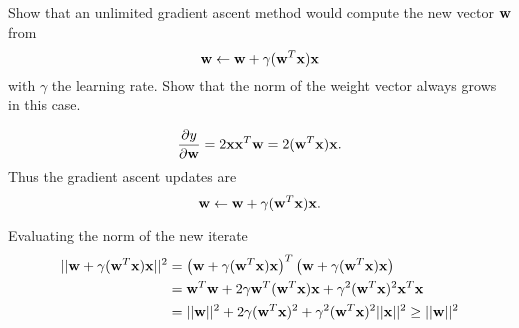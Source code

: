 \begin{enumerate}
  Show that an unlimited gradient ascent method would compute the new
  vector ${\bf w}$ from
  \[
  {\bf w} \leftarrow {\bf w} + \gamma ({\bf w}^T{\bf x}){\bf x}
  \]
  with $\gamma$ the learning rate. Show that the norm of the weight
  vector always grows in this case.

  \begin{solution}


    \begin{equation}
      \frac{\partial y}{\partial \mathbf{w}} = 2 \mathbf{x} \mathbf{x}^T \mathbf{w} = 2 (\mathbf{w}^T \mathbf{x}) \mathbf{x}.
    \end{equation}
    Thus the gradient ascent updates are
    \begin{equation}
      \mathbf{w} \leftarrow \mathbf{w} + \gamma (\mathbf{w}^T \mathbf{x}) \mathbf{x}.
    \end{equation}

    Evaluating the norm of the new iterate
    \begin{equation}
      \begin{split}
        ||\mathbf{w} + \gamma (\mathbf{w}^T \mathbf{x}) \mathbf{x}||^2
        &= \left(\mathbf{w} + \gamma (\mathbf{w}^T \mathbf{x}) \mathbf{x}\right)^T
        \left(\mathbf{w} + \gamma (\mathbf{w}^T \mathbf{x}) \mathbf{x}\right) \\
        &= \mathbf{w}^T \mathbf{w} + 2 \gamma \mathbf{w}^T (\mathbf{w}^T \mathbf{x}) \mathbf{x} + \gamma^2 (\mathbf{w}^T \mathbf{x})^2 \mathbf{x}^T \mathbf{x} \\
        &= ||\mathbf{w}||^2 + 2 \gamma (\mathbf{w}^T \mathbf{x})^2 + \gamma^2 (\mathbf{w}^T \mathbf{x})^2 ||\mathbf{x}||^2
        \ge ||\mathbf{w}||^2
      \end{split}
    \end{equation}

  \end{solution}
  
\end{enumerate}

